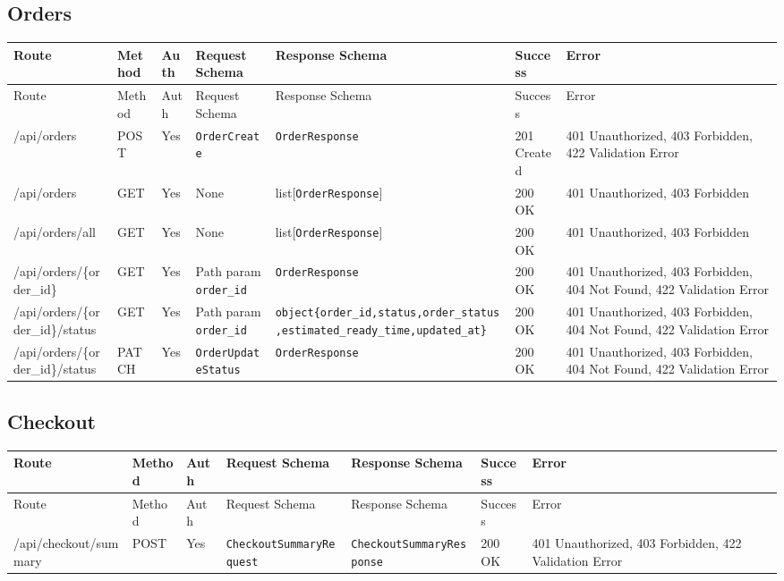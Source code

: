 \subsection{Orders}
\begin{longtable}{p{3.2cm} p{1.7cm} p{2.2cm} p{3.6cm} p{3.6cm} p{1.8cm} p{1.8cm}}
\toprule
Route & Method & Auth & Request Schema & Response Schema & Success & Error \\
\midrule
\endfirsthead
\toprule
Route & Method & Auth & Request Schema & Response Schema & Success & Error \\
\midrule
\endhead
\bottomrule
\endfoot

/api/orders & POST & Yes & \texttt{OrderCreate} & \texttt{OrderResponse} & 201 Created & 401 Unauthorized, 403 Forbidden, 422 Validation Error \\

/api/orders & GET & Yes & None & list[\texttt{OrderResponse}] & 200 OK & 401 Unauthorized, 403 Forbidden \\

/api/orders/all & GET & Yes & None & list[\texttt{OrderResponse}] & 200 OK & 401 Unauthorized, 403 Forbidden \\

/api/orders/\{order\_id\} & GET & Yes & Path param \texttt{order\_id} & \texttt{OrderResponse} & 200 OK & 401 Unauthorized, 403 Forbidden, 404 Not Found, 422 Validation Error \\

/api/orders/\{order\_id\}/status & GET & Yes & Path param \texttt{order\_id} & \texttt{object\{order\_id,status,order\_status,estimated\_ready\_time,updated\_at\}} & 200 OK & 401 Unauthorized, 403 Forbidden, 404 Not Found, 422 Validation Error \\

/api/orders/\{order\_id\}/status & PATCH & Yes & \texttt{OrderUpdateStatus} & \texttt{OrderResponse} & 200 OK & 401 Unauthorized, 403 Forbidden, 404 Not Found, 422 Validation Error \\
\end{longtable}

\subsection{Checkout}
\begin{longtable}{p{3.2cm} p{1.7cm} p{2.2cm} p{3.6cm} p{3.6cm} p{1.8cm} p{1.8cm}}
\toprule
Route & Method & Auth & Request Schema & Response Schema & Success & Error \\
\midrule
\endfirsthead
\toprule
Route & Method & Auth & Request Schema & Response Schema & Success & Error \\
\midrule
\endhead
\bottomrule
\endfoot

/api/checkout/summary & POST & Yes & \texttt{CheckoutSummaryRequest} & \texttt{CheckoutSummaryResponse} & 200 OK & 401 Unauthorized, 403 Forbidden, 422 Validation Error \\
\end{longtable}


